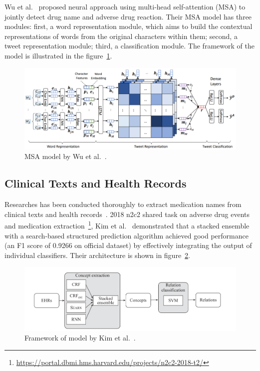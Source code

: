 Wu et al.~\cite{wu2019msa} proposed neural approach using multi-head self-attention (MSA) to jointly detect drug name and adverse drug reaction. Their MSA model has three modules: first, a word representation module, which aims to build the contextual representations of words from the original characters within them; second, a tweet representation module; third, a classification module. The framework of the model is illustrated in the figure~\ref{fig:architecture-wu-msa}.

\begin{figure}[h]
	\centering
	\includegraphics[width=0.99\linewidth]{Figures/k.png}
	\caption{MSA model by Wu et al.~\cite{wu2019msa}.}
	\label{fig:architecture-wu-msa} 
\end{figure}

\subsection{Clinical Texts and Health Records}

Researches has been conducted thoroughly to extract medication names from clinical texts and health records~\cite{weeks2020medextractr, kim2020ensemble, ju2020ensemble}. 2018 n2c2 shared task on adverse drug events and medication extraction~\footnote{\url{https://portal.dbmi.hms.harvard.edu/projects/n2c2-2018-t2/}}, Kim et al.~\cite{kim2020ensemble} demonstrated that a stacked ensemble with a search-based structured prediction algorithm achieved good performance (an F1 score of 0.9266 on official dataset) by effectively integrating the output of individual classifiers. Their architecture is shown in figure~\ref{fig:architecture-kim}.

\begin{figure}[h]
	\centering
	\includegraphics[width=0.99\linewidth]{Figures/i.png}
	\caption{Framework of model by Kim et al.~\cite{kim2020ensemble}.}
	\label{fig:architecture-kim}
\end{figure}

